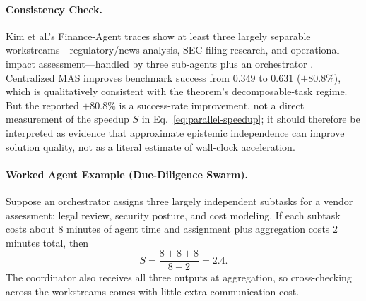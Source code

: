 \paragraph{Consistency Check.} Kim et al.'s Finance-Agent traces show at least three largely separable workstreams---regulatory/news analysis, SEC filing research, and operational-impact assessment---handled by three sub-agents plus an orchestrator \cite{kim2025scaling}. Centralized MAS improves benchmark success from $0.349$ to $0.631$ ($+80.8\%$), which is qualitatively consistent with the theorem's decomposable-task regime. But the reported $+80.8\%$ is a success-rate improvement, not a direct measurement of the speedup $S$ in Eq.~\eqref{eq:parallel-speedup}; it should therefore be interpreted as evidence that approximate epistemic independence can improve solution quality, not as a literal estimate of wall-clock acceleration.

\paragraph{Worked Agent Example (Due-Diligence Swarm).}
Suppose an orchestrator assigns three largely independent subtasks for a vendor assessment: legal review, security posture, and cost modeling. If each subtask costs about $8$ minutes of agent time and assignment plus aggregation costs $2$ minutes total, then
\[
S = \frac{8+8+8}{8+2} = 2.4.
\]
The coordinator also receives all three outputs at aggregation, so cross-checking across the workstreams comes with little extra communication cost.

